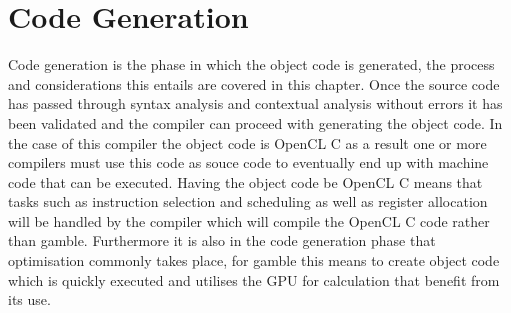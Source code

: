 \chapter{Code Generation}
Code generation is the phase in which the object code is generated, the process and considerations this entails are covered in this chapter.
Once the source code has passed through syntax analysis and contextual analysis without errors it has been validated and the compiler can proceed with generating the object code.
In the case of this compiler the object code is OpenCL C as a result one or more compilers must use this code as souce code to eventually end up with machine code that can be executed.
Having the object code be OpenCL C means that tasks such as instruction selection and scheduling as well as register allocation will be handled by the compiler which will compile the OpenCL C code rather than \gls{gamble}.
Furthermore it is also in the code generation phase that optimisation commonly takes place, for \gls{gamble} this means to create object code which is quickly executed and utilises the \acrshort{GPU} for calculation that benefit from its use.